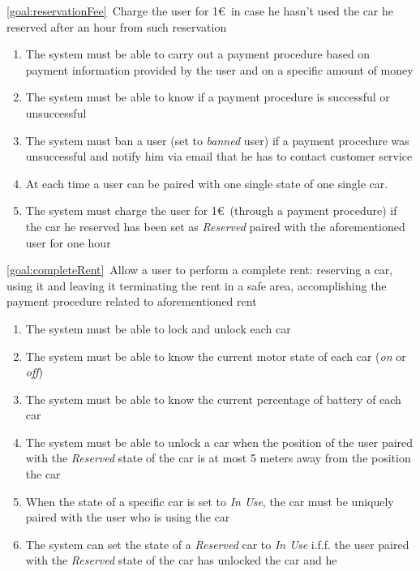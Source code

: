 \begin{description}
\begin{enumerate}[resume*]
   			\end{enumerate}
  		\item \ref{goal:reservationFee}\ Charge the user for 1\euro\ in case he hasn't used the car he reserved after an hour from such reservation
  			\begin{enumerate}[resume*]
  				\item The system must be able to carry out a payment procedure based on payment
  				information provided by the user and on a specific amount of money
  				\item The system must be able to know if a payment procedure is successful or
  				unsuccessful
  				\item The system must ban a user (set to \emph{banned} user) if a
  				payment procedure was unsuccessful and notify him via email that he has to
  				contact customer service
  				\item At each time a user can be paired with one single state of one single car.
  				\item The system must charge the user for 1\euro\ (through a payment procedure) if
  				the car he reserved has been set as \emph{Reserved} paired with the aforementioned
  				user for one hour
   			\end{enumerate}
  		\item \ref{goal:completeRent}\ Allow a user to perform a complete rent: reserving a car, using it and leaving it terminating the rent in a safe area, accomplishing the payment procedure related to aforementioned rent
  			\begin{enumerate}[resume*]
  				\item The system must be able to lock and unlock each car
  				\item The system must be able to know the current motor state of each car
  				(\emph{on} or \emph{off})
  				\item The system must be able to know the current percentage of battery of each car
  				\item The system must be able to unlock a car when the position of the user paired
  				with the
  				\emph{Reserved} state of the car is at most 5 meters away from the position the car
  				\item When the state of a specific car is set to \emph{In Use}, the car must be
 	  			uniquely paired with the user who is using the car
  				\item The system can set the state of a \emph{Reserved} car to \emph{In Use} i.f.f.
  				the user paired with the \emph{Reserved} state of the car has unlocked the car and he

\end{enumerate}
\end{description}
